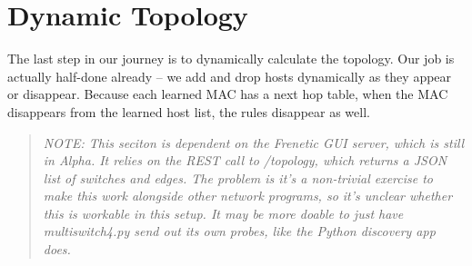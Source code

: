 \section{Dynamic Topology}

The last step in our journey is to dynamically calculate the topology.  Our job is actually half-done already --
we add and drop hosts dynamically as they appear or disappear.  Because each learned MAC has a next hop table,
when the MAC disappears from the learned host list, the rules disappear as well.  

\begin{quotation}
\emph{NOTE:  This seciton is dependent on the Frenetic GUI server, which is still in Alpha.  It relies on the
REST call to /topology, which returns a JSON list of switches and edges.  The problem is it's a non-trivial 
exercise to make this work alongside other network programs, so it's unclear whether this is workable in this
setup.  It may be more doable to just have multiswitch4.py send out its own probes, like the Python
discovery app does.  
}
\end{quotation}
